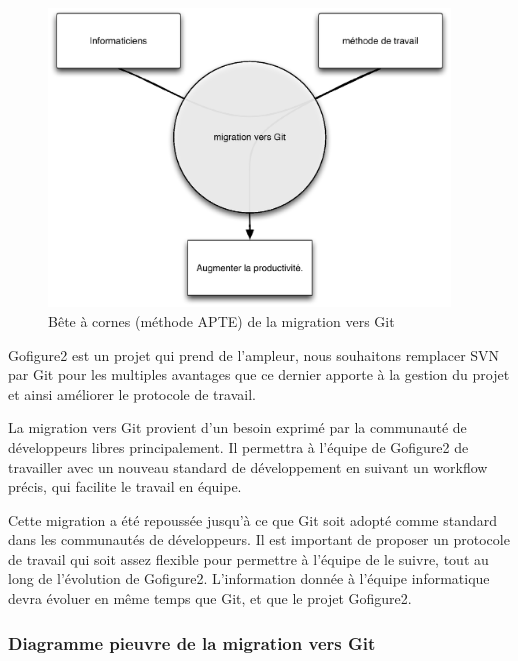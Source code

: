 \begin{figure}[H]
\begin{center}
\leavevmode
\includegraphics[width=0.95\textwidth]{pictures/GitBAC}
\end{center}
\caption{Bête à cornes (méthode {APTE\textregistered}) de la migration vers Git}
\label{fig:BACGit}
\end{figure}

Gofigure2 est un projet qui prend de l'ampleur,
nous souhaitons remplacer SVN par Git pour les multiples avantages
que ce dernier apporte à la gestion du projet et ainsi améliorer le protocole de travail.

La migration vers Git provient d'un besoin exprimé par la communauté de développeurs libres principalement.
Il permettra à l'équipe de Gofigure2 de travailler 
avec un nouveau standard de développement en suivant un workflow précis, qui facilite le travail en équipe.

Cette migration a été repoussée jusqu'à ce que Git soit adopté comme standard dans les communautés de développeurs.
Il est important de proposer un protocole de travail qui soit assez flexible pour permettre à l'équipe de le suivre,
tout au long de l'évolution de Gofigure2.
L'information donnée à l'équipe informatique devra évoluer en même temps que Git, et que le projet Gofigure2.


\subsubsection*{Diagramme pieuvre de la migration vers Git}

